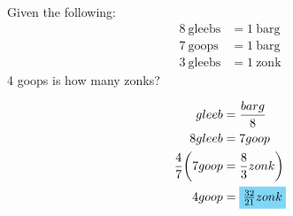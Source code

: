 Given the following: \\
\begin{align*}
	8 \mathrm{\ gleebs} &= 1 \mathrm{\ barg} \\
	7 \mathrm{\ goops}  &= 1 \mathrm{\ barg} \\
	3 \mathrm{\ gleebs} &= 1 \mathrm{\ zonk} 
\end{align*}
4 goops is how many zonks?

\begin{align*}
	gleeb &= \frac{barg}{8} \\
	8gleeb &= 7goop \\
	\frac{4}{7} \biggl( 7goop &= \frac{8}{3}zonk \biggr) \\
	4goop &= \hlbox{$\frac{32}{21}zonk$}
\end{align*}